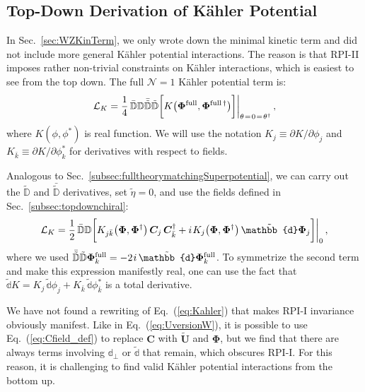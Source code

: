\documentclass[12pt,document,nofootinbib,superscriptaddress,onecolumn,preprintnumbers,balancelastpage]{article}
\newcommand{\full}{\text{full}}
\newcommand{\s}{\hspace{0.8pt}}
\newcommand{\PP}{\mathbb{d}}
\DeclareRobustCommand{\Sec}[1]{Sec.~\ref{#1}}
\DeclareRobustCommand{\Eq}[1]{Eq.~(\ref{#1})}
\newcommand{\bPhi}{ \boldsymbol \Phi}
\newcommand{\bC}{ \boldsymbol C}
\newcommand{\bU}{ \tilde{\boldsymbol U}}
\newcommand{\D}{\mathbb{D}}
\begin{document}
\begin{spacing}{1.2}
\subsection{Top-Down Derivation of K\"ahler Potential}
\label{subsec:fulltheorymatchingKahler}
In \Sec{sec:WZKinTerm}, we only wrote down the minimal kinetic term and did not include more general K\"ahler potential interactions.
%
The reason is that RPI-II imposes rather non-trivial constraints on K\"ahler interactions, which is easiest to see from the top down.
%
The full $\mathcal{N} = 1$ K\"ahler potential term is:
%
\begin{equation}
\mathcal{L}_K = \frac{1}{4} \, \bar{\D} \D \bar{\tilde{\D}} \tilde{\D} \bigg[ K\big(\bPhi^\full, \bPhi^{\full \, \dagger}\big) \bigg] \bigg|_{\theta\s =\s 0\s =\s \theta^\dagger}\,,
\end{equation}
%
where $K(\phi, \phi^*)$ is real function.
%
We will use the notation $K_j \equiv \partial K / \partial \phi_j$ and $K_{\bar{k}} \equiv \partial K / \partial \phi_{k}^*$ for derivatives with respect to fields.


Analogous to \Sec{subsec:fulltheorymatchingSuperpotential}, we can carry out the $\tilde{\D}$ and $\bar{\tilde{\D}}$ derivatives, set $\tilde{\eta} = 0$, and use the fields defined in \Sec{subsec:topdownchiral}:
%
\begin{equation}
\label{eq:Kahler}
\mathcal{L}_K = \frac{1}{2}\, \bar{\D} \D \bigg[ K_{j \bar k}\big(\bPhi, \bPhi^{\dagger}\big)\, \bC_j\,  \bC^\dagger_{\bar{k}}  + i \s K_j\big(\bPhi, \bPhi^{\dagger}\big)\, \tilde{\PP} \bPhi_j  \bigg] \bigg|_{0}\,,
\end{equation}
%
where we used $\bar{\tilde{\D}} \tilde{\D} \bPhi^\full_k= -2\s i\, \tilde{\PP} \bPhi^\full_k$.
%
To symmetrize the second term and make this expression manifestly real, one can use the fact that $\tilde{\PP} K = K_j \, \tilde{\PP} \phi_j +  K_{\bar{k}} \, \tilde{\PP} \phi_{\bar k}^*$ is a total derivative.


We have not found a rewriting of \Eq{eq:Kahler} that makes RPI-I invariance obviously manifest.  
%
Like in \Eq{eq:UversionW}, it is possible to use \Eq{eq:Cfield_def} to replace $\bC$ with $\bU$ and $\bPhi$, but we find that there are always terms involving $\PP_\perp$ or $\tilde{\PP}$ that remain, which obscures RPI-I.  
%
For this reason, it is challenging to find valid K\"ahler potential interactions from the bottom up.


\end{spacing}
\end{document}
